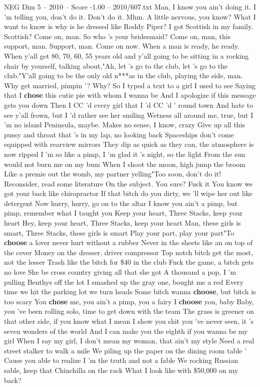 \begin{textsample}{NEG Dim 5 – 2010 – Score -1.00 – 2010/607.txt}  \label{ex:f5_neg_011}
Man, I know you ain't doing it.
I 'm telling you, don't do it.
Don't do it.
Mhm.
A little nervous, you know?
What I want to know is why is he dressed like Roddy Piper?
I got Scottish in my family.
Scottish?
Come on, man.
So who 's your bridesmaid?
Come on, man, this support, man.
Support, man.
Come on now.
When a man is ready, he ready.
When y'all get 80, 70, 60, 55 years old and y'all going to be sitting in a rocking chair by yourself, talking about,"Ah, let 's go to the club, let 's go to the club."Y'all going to be the only old n***as in the club, playing the side, man.
Why get married, pimpin '?
Why?
So I typed a text to a girl I used to see Saying that I \textbf{chose} this cutie pie with whom I wanna be And I apologize if this message gets you down Then I CC 'd every girl that I 'd CC 'd ' round town And hate to see y'all frown, but I 'd rather see her smiling Wetness all around me, true, but I 'm no island Peninsula, maybe.
Makes no sense, I know, crazy Give up all this pussy and throat that 's in my lap, no looking back Spaceships don't come equipped with rearview mirrors They dip as quick as they can, the atmosphere is now ripped I 'm so like a pimp, I 'm glad it 's night, so the light From the sun would not burn me on my bum When I shoot the moon, high jump the broom Like a premie out the womb, my partner yelling"Too soon, don't do it!
Reconsider, read some literature On the subject.
You sure?
Fuck it You know we got your back like chiropractor If that bitch do you dirty, we 'll wipe her out like detergent Now hurry, hurry, go on to the altar I know you ain't a pimp, but pimp, remember what I taught you Keep your heart, Three Stacks, keep your heart Hey, keep your heart, Three Stacks, keep your heart Man, these girls is smart, Three Stacks, these girls is smart Play your part, play your part"To \textbf{choose} a lover never hurt without a rubber Never in the sheets like an on top of the cover Money on the dresser, driver compressor Top notch bitch get the most, not the lesser Trash like the bitch for \$40 in the club Fuck the game, a bitch gets no love She be cross country giving all that she got A thousand a pop, I 'm pulling Benthys off the lot I smashed up the gray one, bought me a red Every time we hit the parking lot we turn heads Some bitch wanna \textbf{choose}, but bitch is too scary You \textbf{chose} me, you ain't a pimp, you a fairy I \textbf{choose} you, baby Baby, you 've been rolling solo, time to get down with the team The grass is greener on that other side, if you know what I mean I show you shit you 've never seen, it 's seven wonders of the world And I can make you the eighth if you wanna be my girl When I say my girl, I don't mean my woman, that ain't my style Need a real street stalker to walk a mile We piling up the paper on the dining room table ' Cause you able to realize I 'm the truth and not a fable We rocking Russian sable, keep that Chinchilla on the rack What I look like with \$50,000 on my back?

\end{textsample}
